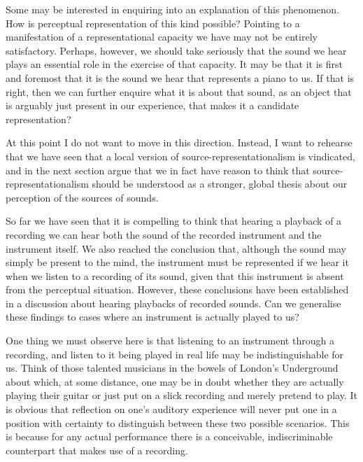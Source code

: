 \documentclass[sloppy, journal, git, bytitle, dodraft]{humapap}
\begin{document}
Some may be interested in enquiring into an explanation of this phenomenon. How is perceptual representation of this kind possible? Pointing to a manifestation of a representational capacity we have may not be entirely satisfactory. Perhaps, however, we should take seriously that the sound we hear plays an essential role in the exercise of that capacity. It may be that it is first and foremost that it is the sound we hear that represents a piano to us. If that is right, then we can further enquire what it is about that sound, as an object that is arguably just present in our experience, that makes it a candidate representation? 

At this point I do not want to move in this direction. Instead, I want to rehearse that we have seen that a local version of source-representationalism is vindicated, and in the next section argue that we in fact have reason to think that source-representationalism should be understood as a stronger, global thesis about our perception of the sources of sounds. 


\sect So far we have seen that it is compelling to think that hearing a playback of a recording we can hear both the sound of the recorded instrument and the instrument itself. We also reached the conclusion that, although the sound may simply be present to the mind, the instrument must be represented if we hear it when we listen to a recording of its sound, given that this instrument is absent from the perceptual situation. However, these conclusions have been established in a discussion about hearing playbacks of recorded sounds. Can we generalise these findings to cases where an instrument is actually played to us? 

One thing we must observe here is that listening to an instrument through a recording, and listen to it being played in real life may be indistinguishable for us. Think of those talented musicians in the bowels of London's Underground about which, at some distance, one may be in doubt whether they are actually playing their guitar or just put on a slick recording and merely pretend to play. It is obvious that reflection on one's auditory experience will never put one in a position with certainty to distinguish between these two possible scenarios. This is because for any actual performance there is a conceivable, indiscriminable counterpart that makes use of a recording. 
\end{document}
